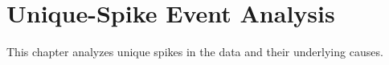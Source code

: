 
\chapter{Unique-Spike Event Analysis}

This chapter analyzes unique spikes in the data and their underlying causes.

